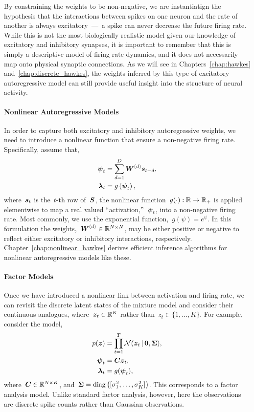By constraining the weights to be non-negative, we are instantiatign
the hypothesis that the interactions between spikes on one neuron and
the rate of another is always excitatory~---~a spike can never
decrease the future firing rate. While this is not the most
biologically realistic model given our knowledge of excitatory and
inhibitory synapses, it is important to remember that this is simply a
descriptive model of firing rate dynamics, and it does not necessarily
map onto physical synaptic connections. As we will see in
Chapters~\ref{chap:hawkes} and~\ref{chap:discrete_hawkes}, the weights
inferred by this type of excitatory autoregressive model can still
provide useful insight into the structure of neural activity.

\paragraph{Nonlinear Autoregressive Models}
In order to capture both excitatory and inhibitory autoregressive weights,
we need to introduce a nonlinear function that ensure a non-negative firing 
rate. Specifically, assume that,
\begin{align}
  \boldsymbol{\psi}_t &= \sum_{d=1}^D \boldsymbol{W}^{(d)} \boldsymbol{s}_{t-d}, \\
  \boldsymbol{\lambda}_t &= g \left( \boldsymbol{\psi}_t \right),
\end{align}
where~$\boldsymbol{s}_{t}$ is the~$t$-th row of~$\boldsymbol{S}$, the nonlinear
function~${g(\cdot): \mathbb{R} \to \mathbb{R}_+}$ is applied elementwise to
map a real valued ``activation,''~$\boldsymbol{\psi}_t$, into a non-negative
firing rate. Most commonly, we use the exponential
function,~$g(\psi) = e^\psi$. In this formulation the
weights,~${\boldsymbol{W}^{(d)} \in \mathbb{R}^{N \times N}}$, may be either positive
or negative to reflect either excitatory or inhibitory interactions,
respectively. Chapter~\ref{chap:nonlinear_hawkes} derives efficient
inference algorithms for nonlinear autoregressive models like these.

\paragraph{Factor Models}
Once we have introduced a nonlinear link between activation and firing
rate, we can revisit the discrete latent states of the mixture model
and consider their continuous analogues, where~$\boldsymbol{z}_t \in \mathbb{R}^K$
rather than~$z_t \in \{1, \ldots, K\}$. For example, consider the
model,
\begin{align}
  p(\boldsymbol{z}) &= \prod_{t=1}^T \mathcal{N}(\boldsymbol{z}_t \,|\, \boldsymbol{0}, \boldsymbol{\Sigma}), \\
  \boldsymbol{\psi}_t &= \boldsymbol{C} \boldsymbol{z}_t, \\
  \boldsymbol{\lambda}_t &= g(\boldsymbol{\psi}_t),
\end{align}
where~$\boldsymbol{C} \in \mathbb{R}^{N \times
  K}$, and~${\boldsymbol{\Sigma} = \mathrm{diag} \left([ \sigma^2_1, \ldots, \sigma^2_K ] \right)}$.
This corresponds to a factor analysis model. Unlike standard 
factor analysis, however, here the observations are discrete spike 
counts rather than Gaussian observations. 

